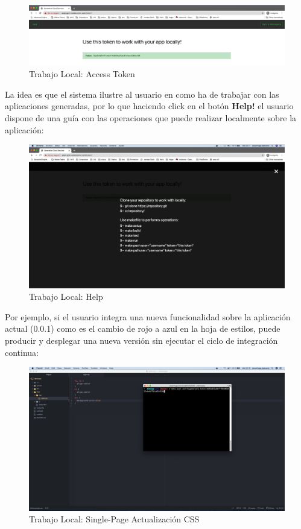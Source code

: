 \documentclass[a4paper,11pt]{book}
\begin{document}
   \begin{figure}[H]
\centering
\includegraphics[scale=0.25]{imagenes/casouso/3_3_a.png}
\caption{ Trabajo Local:  Access Token  }
\end{figure}

La idea es que el sistema ilustre al usuario en como ha de trabajar con las aplicaciones generadas, por lo  que haciendo click en el botón \textbf{Help!} el usuario dispone de una guía con las operaciones que puede realizar localmente sobre la aplicación:

   \begin{figure}[H]
\centering
\includegraphics[scale=0.2]{imagenes/casouso/3_4.png}
\caption{   Trabajo Local: Help}
\end{figure}

Por ejemplo, si el usuario integra una nueva funcionalidad sobre la aplicación actual (0.0.1) como es el cambio de rojo a azul en la hoja de estilos, puede producir y desplegar una nueva versión sin ejecutar el ciclo de integración continua:

   \begin{figure}[H]
\centering
\includegraphics[scale=0.2]{imagenes/casouso/3_5.png}
\caption{   Trabajo Local: Single-Page Actualización CSS}
\end{figure}
\end{document}
